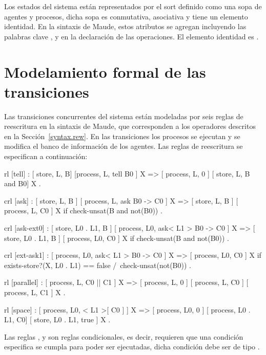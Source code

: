 Los estados del sistema est\'an representados por el sort  definido como una sopa de agentes y procesos, dicha sopa es conmutativa, asociativa y tiene un elemento identidad. En la sintaxis de Maude, estos atributos se agregan incluyendo las palabras clave ,  y  en la declaraci\'on de las operaciones. El elemento identidad es .

\section{Modelamiento formal de las transiciones}
\label{rules.rew}

Las transiciones concurrentes del sistema est\'an modeladas por seis reglas de reescritura en la sintaxis de Maude, que corresponden a los operadores descritos en la Secci\'on~\ref{syntax.rew}. En las transiciones los procesos se ejecutan y se modifica el banco de informaci\'on de los agentes. Las reglas de reescritura se especifican a continuaci\'on: 

\begin{maude}
  rl [tell] :
     { [ store, L, B] [process, L, tell B0 ] X }
  => { [ process, L, 0 ] [ store, L, B and B0] X } .

 crl [ask] :
     { [ store, L, B ] [ process, L, ask B0  -> C0 ] X }
  => { [ store, L, B ] [ process, L, C0 ] X }
  if check-unsat(B and not(B0)) .

 crl [ask-ext0] :
     { [ store, L0 . L1, B ] 
       [ process, L0, ask< L1 > B0  -> C0 ] X }
  => { [ store, L0 . L1, B ] [ process, L0, C0 ] X }
  if check-unsat(B and not(B0)) . 

 crl [ext-ask1] :
     { [ process, L0, ask< L1 > B0  -> C0 ] X }
  => { [ process, L0, C0 ] X }
  if exists-store?(X, L0 . L1) == false
  /\ check-unsat(not(B0)) . 

  rl [parallel] :
     { [ process, L, C0 || C1 ] X }
  => { [ process, L, 0 ] [ process, L, C0 ] 
       [ process, L, C1 ] X } .

  rl [space] :
     { [ process, L0, < L1 >[ C0 ] ] X } 
  => { [ process, L0, 0 ] [ process, L0 . L1, C0] 
       [ store, L0 . L1, true ] X } .
\end{maude}

Las reglas \cde{[ask]},  y  son reglas condicionales, es decir, requieren que una condici\'on especifica se cumpla para poder ser ejecutadas, dicha condici\'on debe ser de tipo .

